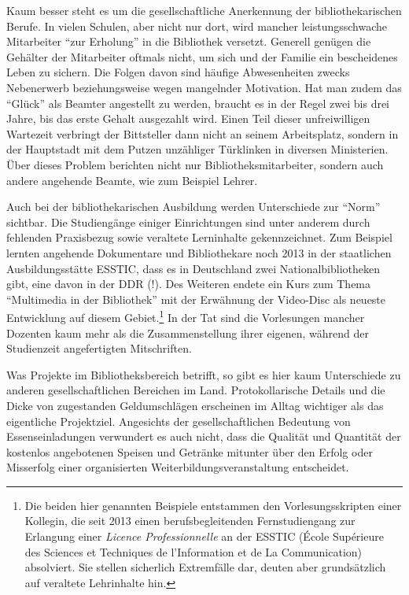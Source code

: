 \documentclass[a4paper,
fontsize=11pt,
oneside,
numbers=noperiodatend,
parskip=half-,
bibliography=totoc,
final
]{scrartcl}
\begin{document}
Kaum besser steht es um die gesellschaftliche Anerkennung der
bibliothekarischen Berufe. In vielen Schulen, aber nicht nur dort, wird
mancher leistungsschwache Mitarbeiter \enquote{zur Erholung} in die
Bibliothek versetzt. Generell genügen die Gehälter der Mitarbeiter
oftmals nicht, um sich und der Familie ein bescheidenes Leben zu
sichern. Die Folgen davon sind häufige Abwesenheiten zwecks Nebenerwerb
beziehungsweise wegen mangelnder Motivation. Hat man zudem das
\enquote{Glück} als Beamter angestellt zu werden, braucht es in der
Regel zwei bis drei Jahre, bis das erste Gehalt ausgezahlt wird. Einen
Teil dieser unfreiwilligen Wartezeit verbringt der Bittsteller dann
nicht an seinem Arbeitsplatz, sondern in der Hauptstadt mit dem Putzen
unzähliger Türklinken in diversen Ministerien. Über dieses Problem
berichten nicht nur Bibliotheksmitarbeiter, sondern auch andere
angehende Beamte, wie zum Beispiel Lehrer.

Auch bei der bibliothekarischen Ausbildung werden Unterschiede zur
\enquote{Norm} sichtbar. Die Studiengänge einiger Einrichtungen sind
unter anderem durch fehlenden Praxisbezug sowie veraltete Lerninhalte
gekennzeichnet. Zum Beispiel lernten angehende Dokumentare und
Bibliothekare noch 2013 in der staatlichen Ausbildungsstätte ESSTIC,
dass es in Deutschland zwei Nationalbibliotheken gibt, eine davon in der
DDR (!). Des Weiteren endete ein Kurs zum Thema \enquote{Multimedia in
der Bibliothek} mit der Erwähnung der Video-Disc als neueste Entwicklung
auf diesem Gebiet.\footnote{Die beiden hier genannten Beispiele
  entstammen den Vorlesungsskripten einer Kollegin, die seit 2013 einen
  berufsbegleitenden Fernstudiengang zur Erlangung einer \emph{Licence
  Professionnelle} an der ESSTIC (École Supérieure des Sciences et
  Techniques de l'Information et de La Communication) absolviert. Sie
  stellen sicherlich Extremfälle dar, deuten aber grundsätzlich auf
  veraltete Lehrinhalte hin.} In der Tat sind die Vorlesungen mancher
Dozenten kaum mehr als die Zusammenstellung ihrer eigenen, während der
Studienzeit angefertigten Mitschriften.

Was Projekte im Bibliotheksbereich betrifft, so gibt es hier kaum
Unterschiede zu anderen gesellschaftlichen Bereichen im Land.
Protokollarische Details und die Dicke von zugestanden Geldumschlägen
erscheinen im Alltag wichtiger als das eigentliche Projektziel.
Angesichts der gesellschaftlichen Bedeutung von Essenseinladungen
verwundert es auch nicht, dass die Qualität und Quantität der kostenlos
angebotenen Speisen und Getränke mitunter über den Erfolg oder
Misserfolg einer organisierten Weiterbildungsveranstaltung entscheidet.
\end{document}
